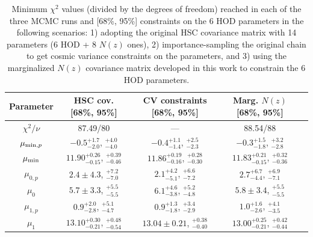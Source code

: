 \documentclass[a4paper,11pt]{article}
\begin{document}
\begin{table}
\begin{center}
\begin{tabular}{c | c c c c} 
 \hline\hline
 Parameter & HSC cov. [68\%, 95\%] & CV constraints [68\%, 95\%] & Marg. $N(z)$ [68\%, 95\%] \\ [0.5ex] 
 \hline
 $\chi^2/\nu$ & 87.49/80 & --- & 88.54/88 \\ 
$\mu_{{\rm min},p}$ & $-0.5^{+1.7}_{-2.0}$, $^{+4.0}_{-4.0}$ & $-0.4^{+1.1}_{-1.4}$, $^{+2.5}_{-2.3}$ & $-0.3^{+1.5}_{-1.8}$, $^{+3.2}_{-2.8}$ \\ [1ex]
$\mu_{\rm min}$ & $11.90^{+0.26}_{-0.15}$, $^{+0.39}_{-0.46}$ & $11.86^{+0.19}_{-0.16}$, $^{+0.28}_{-0.30}$ & $11.83^{+0.21}_{-0.15}$, $^{+0.32}_{-0.36}$ \\ [1ex]
$\mu_{0,p}$ & $2.4\pm 4.3$, $^{+7.2}_{-7.0}$ & $2.1^{+4.2}_{-5.1}$, $^{+6.6}_{-7.2}$ & $2.7^{+6.7}_{-4.4}$, $^{+6.9}_{-7.1}$ \\ [1ex]
$\mu_{0}$ & $5.7\pm 3.3$, $^{+5.5}_{-5.5}$ & $6.1^{+4.6}_{-3.8}$, $^{+5.2}_{-4.8}$ & $5.8\pm 3.4$, $^{+5.5}_{-5.5}$ \\ [1ex]
$\mu_{1,p}$ & $0.9^{+2.0}_{-2.8}$, $^{+5.1}_{-4.7}$ & $0.9^{+1.3}_{-1.8}$, $^{+3.4}_{-2.9}$ & $1.0^{+1.6}_{-2.6}$, $^{+4.1}_{-3.5}$ \\ [1ex]
$\mu_{1}$ & $13.10^{+0.30}_{-0.21}$, $^{+0.48}_{-0.54}$ & $13.04\pm 0.21$, $^{+0.38}_{-0.40}$ & $13.00^{+0.25}_{-0.21}$, $^{+0.42}_{-0.44}$ \\ [1ex]
 \hline
 \hline
\end{tabular}
\end{center}
\caption{Minimum $\chi^2$ values (divided by the degrees
of freedom) reached in each of the three MCMC runs
and [68\%, 95\%] constraints on the 6 HOD parameters
in the following scenarios: 1) adopting the original
HSC covariance matrix with 14 
parameters (6 HOD + 8 $N(z)$ ones), 2)
importance-sampling the original
chain to get cosmic variance constraints on 
the parameters, and 3) using the
marginalized $N(z)$ covariance matrix
developed in this work to constrain
the 6 HOD parameters.}
\label{tab:chi2_fid}
\end{table}
\end{document}
